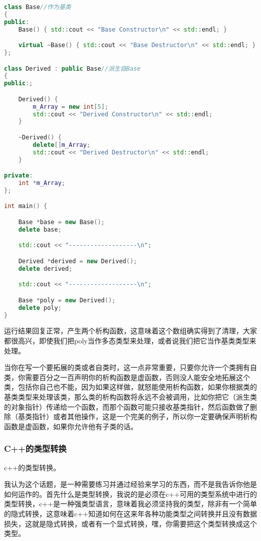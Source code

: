 \begin{lstlisting}[language=c++]
class Base//作为基类
{
public:
    Base() { std::cout << "Base Constructor\n" << std::endl; }

    virtual ~Base() { std::cout << "Base Destructor\n" << std::endl; }
};

class Derived : public Base//派生自Base
{
public:;

    Derived() {
        m_Array = new int[5];
        std::cout << "Derived Constructor\n" << std::endl;
    }

    ~Derived() {
        delete[]m_Array;
        std::cout << "Derived Destructor\n" << std::endl;
    }

private:
    int *m_Array;
};

int main() {

    Base *base = new Base();
    delete base;

    std::cout << "-------------------\n";

    Derived *derived = new Derived();
    delete derived;

    std::cout << "-------------------\n";

    Base *poly = new Derived();
    delete poly;
}
\end{lstlisting}

运行结果回复正常，产生两个析构函数，这意味着这个数组确实得到了清理，大家都很高兴，即使我们把{\ncodestyle poly}当作多态类型来处理，或者说我们把它当作基类类型来处理。

当你在写一个要拓展的类或者自类时，这一点非常重要，只要你允许一个类拥有自类，你需要百分之一百声明你的析构函数是虚函数，否则没人能安全地拓展这个类，包括你自己也不能，因为如果这样做，就怒能使用析构函数，如果你根据类的基类类型来处理该类，那么类的析构函数将永远不会被调用，比如你把它（派生类的对象指针）传递给一个函数，而那个函数可能只接收基类指针，然后函数做了删除（基类指针）或者其他操作，这是一个完美的例子，所以你一定要确保声明析构函数是虚函数，如果你允许他有子类的话。


\subsubsection{C++的类型转换}

c++的类型转换。

我认为这个话题，是一种需要练习并通过经验来学习的东西，而不是我告诉你他是如何运作的。首先什么是类型转换，我说的是必须在c++可用的类型系统中进行的类型转换，c++是一种强类型语言，意味着我必须坚持我的类型，除非有一个简单的隐式转换，这意味着c++知道如何在这来年各种功能类型之间转换并且没有数据损失，这就是隐式转换，或者有一个显式转换，嘿，你需要把这个类型转换成这个类型。

